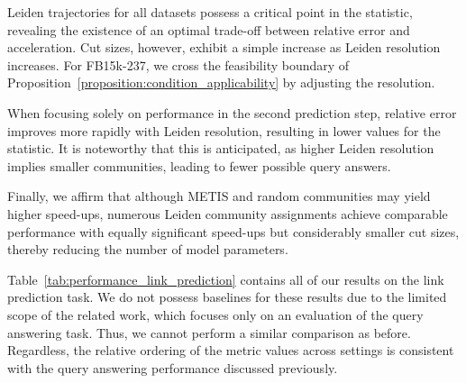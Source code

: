 Leiden trajectories for all datasets possess a critical point in the statistic, revealing the existence of an optimal trade-off between relative error and acceleration. Cut sizes, however, exhibit a simple increase as Leiden resolution increases. For FB15k-237, we cross the feasibility boundary of Proposition~\ref{proposition:condition_applicability} by adjusting the resolution. 

When focusing solely on performance in the second prediction step, relative error improves more rapidly with Leiden resolution, resulting in lower values for the statistic. It is noteworthy that this is anticipated, as higher Leiden resolution implies smaller communities, leading to fewer possible query answers. 

Finally, we affirm that although METIS and random communities may yield higher speed-ups, numerous Leiden community assignments achieve comparable performance with equally significant speed-ups but considerably smaller cut sizes, thereby reducing the number of model parameters.

Table~\ref{tab:performance_link_prediction} contains all of our results on the link prediction task. We do not possess baselines for these results due to the limited scope of the related work, which focuses only on an evaluation of the query answering task. Thus, we cannot perform a similar comparison as before. Regardless, the relative ordering of the metric values across settings is consistent with the query answering performance discussed previously.

